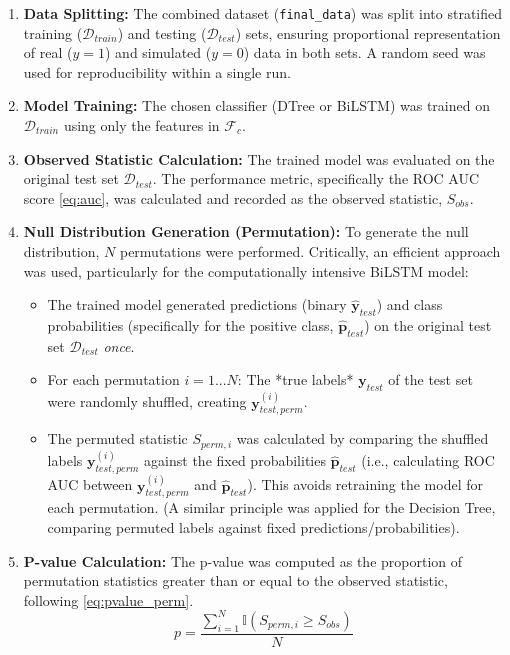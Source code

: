 \begin{enumerate}
  \item \textbf{Data Splitting:} The combined dataset (\texttt{final\_data}) was split into stratified training ($\mathcal{D}_{train}$) and testing ($\mathcal{D}_{test}$) sets, ensuring proportional representation of real ($y=1$) and simulated ($y=0$) data in both sets. A random seed was used for reproducibility within a single run.
  \item \textbf{Model Training:} The chosen classifier (DTree or BiLSTM) was trained on $\mathcal{D}_{train}$ using only the features in $\mathcal{F}_c$.
  \item \textbf{Observed Statistic Calculation:} The trained model was evaluated on the original test set $\mathcal{D}_{test}$. The performance metric, specifically the ROC AUC score \autoref{eq:auc}, was calculated and recorded as the observed statistic, $S_{obs}$.
  \item \textbf{Null Distribution Generation (Permutation):} To generate the null distribution, $N$ permutations were performed. Critically, an efficient approach was used, particularly for the computationally intensive BiLSTM model:
        \begin{itemize}
          \item The trained model generated predictions (binary $\hat{\mathbf{y}}_{test}$) and class probabilities (specifically for the positive class, $\hat{\mathbf{p}}_{test}$) on the original test set $\mathcal{D}_{test}$ \textit{once}.
          \item For each permutation $i=1...N$: The *true labels* $\mathbf{y}_{test}$ of the test set were randomly shuffled, creating $\mathbf{y}_{test, perm}^{(i)}$.
          \item The permuted statistic $S_{perm, i}$ was calculated by comparing the shuffled labels $\mathbf{y}_{test, perm}^{(i)}$ against the fixed probabilities $\hat{\mathbf{p}}_{test}$ (i.e., calculating ROC AUC between $\mathbf{y}_{test, perm}^{(i)}$ and $\hat{\mathbf{p}}_{test}$). This avoids retraining the model for each permutation. (A similar principle was applied for the Decision Tree, comparing permuted labels against fixed predictions/probabilities).
        \end{itemize}
  \item \textbf{P-value Calculation:} The p-value was computed as the proportion of permutation statistics greater than or equal to the observed statistic, following \autoref{eq:pvalue_perm}.
        \begin{equation}
          p = \frac{\sum_{i=1}^{N} \mathbb{I}(S_{perm, i} \ge S_{obs})}{N}
          \nonumber
        \end{equation}
\end{enumerate}

